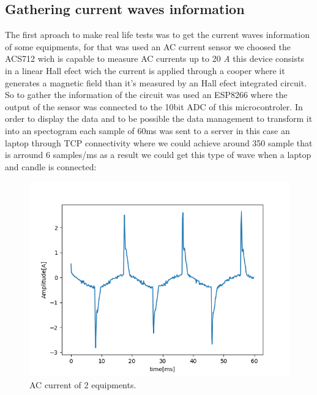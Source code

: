 \documentclass[conference]{IEEEtran}
\begin{document}
\subsection{Gathering current waves information}\label{AA}
The first aproach to make real life tests was to get the current waves information of some equipments, for that was used an AC current sensor we choosed the ACS712 wich is capable to measure AC currents up to 20 {\it A} this device consists in a linear Hall efect wich the current is applied through a cooper where it generates a magnetic field than it's measured by an Hall efect integrated circuit.
So to gather the information of the circuit was used an ESP8266 where the output of the sensor was connected to the 10bit ADC of this microcontroler. In order to display the data and to be possible the data management to transform it into an spectogram each sample of 60ms was sent to a server in this case an laptop through TCP connectivity where we could achieve around 350 sample that is arround 6 samples/ms as a result we could get this type of wave when a laptop and candle is connected:
\begin{figure}[htbp]
\centerline{\includegraphics[scale=0.4]{lastwave.png}}
\caption{AC current of 2 equipments.}
\label{fig}
\end{figure}
\end{document}
